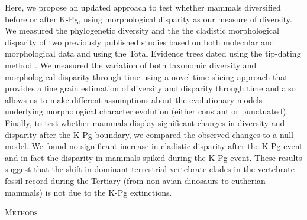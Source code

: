 \documentclass[12pt,letterpaper]{article}
\renewcommand{\section}[1]{%
\bigskip
\begin{center}
\begin{Large}
\normalfont\scshape #1
\medskip
\end{Large}
\end{center}}
\begin{document}
Here, we propose an updated approach to test whether mammals diversified before or after K-Pg, using morphological disparity as our measure of diversity.
We measured the phylogenetic diversity and the the cladistic morphological disparity of two previously published studies \citep{Slater2012MEE,beckancient2014} based on both molecular and morphological data and using the Total Evidence trees dated using the tip-dating method \citep{ronquista2012,Wood01032013}.
We measured the variation of both taxonomic diversity and morphological disparity through time using a novel time-slicing approach that provides a fine grain estimation of diversity and disparity through time and also allows us to make different assumptions about the evolutionary models underlying morphological character evolution (either constant or punctuated). 
Finally, to test whether mammals display significant changes in diversity and disparity after the K-Pg boundary, we compared the observed changes to a null model. 
We found no significant increase in cladistic disparity after the K-Pg event and in fact the disparity in mammals spiked during the K-Pg event. 
These results suggest that the shift in dominant terrestrial vertebrate clades in the vertebrate fossil record during the Tertiary (from non-avian dinosaurs to eutherian mammals) is not due to the K-Pg extinctions.

%
%

\section{Methods}

\end{document}
